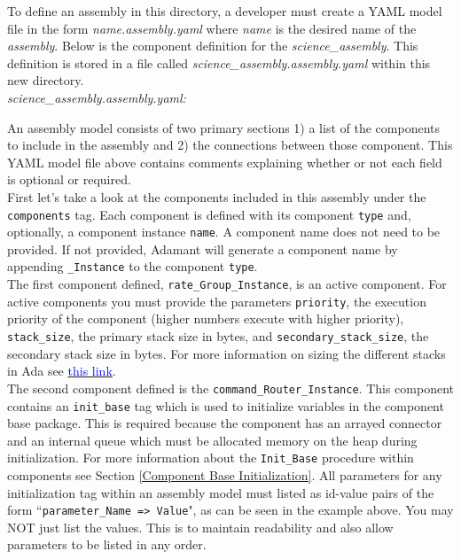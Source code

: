 To define an assembly in this directory, a developer must create a YAML model file in the form \textit{name.assembly.yaml} where \textit{name} is the desired name of the \textit{assembly}. Below is the component definition for the \textit{science\_assembly}. This definition is stored in a file called \textit{science\_assembly.assembly.yaml} within this new directory. \\

\textit{science\_assembly.assembly.yaml:}

An assembly model consists of two primary sections 1) a list of the components to include in the assembly and 2) the connections between those component. This YAML model file above contains comments explaining whether or not each field is optional or required. \\

First let's take a look at the components included in this assembly under the \texttt{components} tag. Each component is defined with its component \texttt{type} and, optionally, a component instance \texttt{name}. A component name does not need to be provided. If not provided, Adamant will generate a component name by appending \texttt{\_Instance} to the component \texttt{type}. \\

The first component defined, \texttt{rate\_Group\_Instance}, is an active component. For active components you must provide the parameters \texttt{priority}, the execution priority of the component (higher numbers execute with higher priority), \texttt{stack\_size}, the primary stack size in bytes, and \texttt{secondary\_stack\_size}, the secondary stack size in bytes. For more information on sizing the different stacks in Ada see \href{https://docs.adacore.com/gnat_ugx-docs/html/gnat_ugx/gnat_ugx/the_stacks.html}{\textcolor{blue}{this link}}. \\

The second component defined is the \texttt{command\_Router\_Instance}. This component contains an \texttt{init\_base} tag which is used to initialize variables in the component base package. This is required because the component has an arrayed connector and an internal queue which must be allocated memory on the heap during initialization. For more information about the \texttt{Init\_Base} procedure within components see Section \ref{Component Base Initialization}. All parameters for any initialization tag within an assembly model must listed as id-value pairs of the form ``\texttt{parameter\_Name => Value}", as can be seen in the example above. You may NOT just list the values. This is to maintain readability and also allow parameters to be listed in any order. \\

